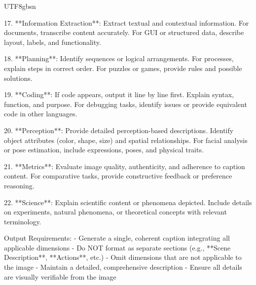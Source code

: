 \begin{CJK*}{UTF8}{gbsn}
\begin{tcblisting}
17. **Information Extraction**:
Extract textual and contextual information.
For documents, transcribe content accurately.
For GUI or structured data, describe layout, labels, and functionality.

18. **Planning**:
Identify sequences or logical arrangements.
For processes, explain steps in correct order.
For puzzles or games, provide rules and possible solutions.

19. **Coding**:
If code appears, output it line by line first.
Explain syntax, function, and purpose.
For debugging tasks, identify issues or provide equivalent code in other languages.

20. **Perception**:
Provide detailed perception-based descriptions.
Identify object attributes (color, shape, size) and spatial relationships.
For facial analysis or pose estimation, include expressions, poses, and physical traits.

21. **Metrics**:
Evaluate image quality, authenticity, and adherence to caption content.
For comparative tasks, provide constructive feedback or preference reasoning.

22. **Science**:
Explain scientific content or phenomena depicted.
Include details on experiments, natural phenomena, or theoretical concepts with relevant terminology.


Output Requirements:
- Generate a single, coherent caption integrating all applicable dimensions
- Do NOT format as separate sections (e.g., **Scene Description**, **Actions**, etc.)
- Omit dimensions that are not applicable to the image
- Maintain a detailed, comprehensive description
- Ensure all details are visually verifiable from the image
\end{tcblisting}


\end{CJK*}

